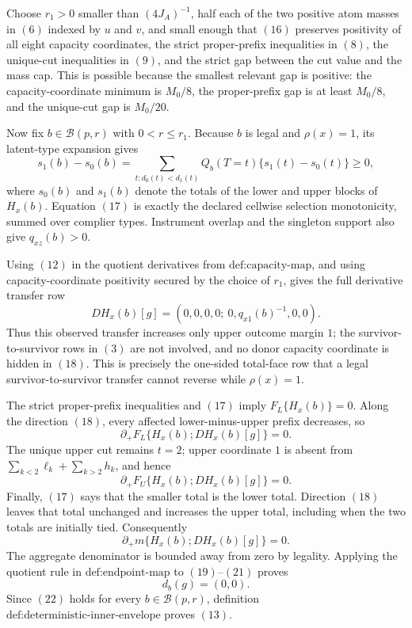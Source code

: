 Choose \(r_1>0\) smaller than \((4J_A)^{-1}\), half each of the two positive atom masses in \((6)\) indexed by \(u\) and \(v\), and small enough that \((16)\) preserves positivity of all eight capacity coordinates, the strict proper-prefix inequalities in \((8)\), the unique-cut inequalities in \((9)\), and the strict gap between the cut value and the mass cap.  This is possible because the smallest relevant gap is positive: the capacity-coordinate minimum is \(M_0/8\), the proper-prefix gap is at least \(M_0/8\), and the unique-cut gap is \(M_0/20\).

Now fix \(b\in\mathcal B(p,r)\) with \(0<r\le r_1\).  Because \(b\) is legal and \(\rho(x)=1\), its latent-type expansion gives
\[
 s_1(b)-s_0(b)
 =\sum_{t:d_0(t)<d_1(t)}Q_b(T=t)\{s_1(t)-s_0(t)\}\ge0,
\tag{17}
\]
where \(s_0(b)\) and \(s_1(b)\) denote the totals of the lower and upper blocks of \(H_x(b)\).  Equation \((17)\) is exactly the declared cellwise selection monotonicity, summed over complier types.  Instrument overlap and the singleton support also give \(q_{xz}(b)>0\).

Using \((12)\) in the quotient derivatives from \(\text{def:capacity-map}\), and using capacity-coordinate positivity secured by the choice of \(r_1\), gives the full derivative transfer row
\[
 D H_x(b)[g]
 =\left(0,0,0,0;\ 0,q_{x1}(b)^{-1},0,0\right).
\tag{18}
\]
Thus this observed transfer increases only upper outcome margin \(1\); the survivor-to-survivor rows in \((3)\) are not involved, and no donor capacity coordinate is hidden in \((18)\).  This is precisely the one-sided total-face row that a legal survivor-to-survivor transfer cannot reverse while \(\rho(x)=1\).

The strict proper-prefix inequalities and \((17)\) imply \(F_L\{H_x(b)\}=0\).  Along the direction \((18)\), every affected lower-minus-upper prefix decreases, so
\[
 \partial_+F_L\{H_x(b);D H_x(b)[g]\}=0.
\tag{19}
\]
The unique upper cut remains \(t=2\); upper coordinate \(1\) is absent from
\(\sum_{k<2}\ell_k+\sum_{k>2}h_k\), and hence
\[
 \partial_+F_U\{H_x(b);D H_x(b)[g]\}=0.
\tag{20}
\]
Finally, \((17)\) says that the smaller total is the lower total.  Direction \((18)\) leaves that total unchanged and increases the upper total, including when the two totals are initially tied.  Consequently
\[
 \partial_+m\{H_x(b);D H_x(b)[g]\}=0.
\tag{21}
\]
The aggregate denominator is bounded away from zero by legality.  Applying the quotient rule in \(\text{def:endpoint-map}\) to \((19)\)--\((21)\) proves
\[
 d_b(g)=(0,0).
\tag{22}
\]
Since \((22)\) holds for every \(b\in\mathcal B(p,r)\), definition \(\text{def:deterministic-inner-envelope}\) proves \((13)\).

